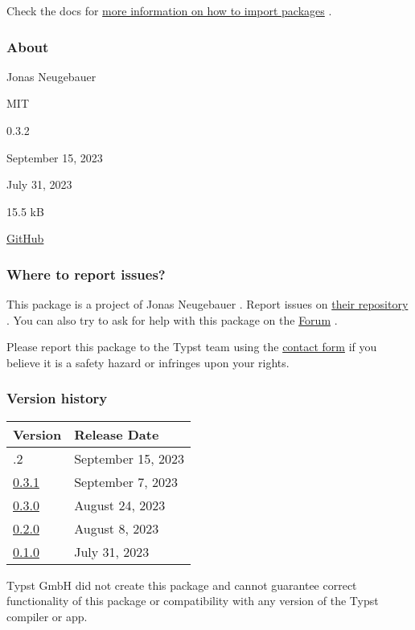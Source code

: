 Check the docs for
\href{https://typst.app/docs/reference/scripting/\#packages}{more
information on how to import packages} .

\subsubsection{About}\label{about}

\begin{description}
\tightlist
\item[Author :]
Jonas Neugebauer
\item[License:]
MIT
\item[Current version:]
0.3.2
\item[Last updated:]
September 15, 2023
\item[First released:]
July 31, 2023
\item[Archive size:]
15.5 kB
\href{https://packages.typst.org/preview/t4t-0.3.2.tar.gz}{\pandocbounded{}}
\item[Repository:]
\href{https://github.com/jneug/typst-tools4typst}{GitHub}
\end{description}

\subsubsection{Where to report issues?}\label{where-to-report-issues}

This package is a project of Jonas Neugebauer . Report issues on
\href{https://github.com/jneug/typst-tools4typst}{their repository} .
You can also try to ask for help with this package on the
\href{https://forum.typst.app}{Forum} .

Please report this package to the Typst team using the
\href{https://typst.app/contact}{contact form} if you believe it is a
safety hazard or infringes upon your rights.

\label{versions}
\subsubsection{Version history}\label{version-history}

\begin{longtable}[]{@{}ll@{}}
\toprule\noalign{}
Version & Release Date \\
\midrule\noalign{}
\endhead
\bottomrule\noalign{}
\endlastfoot
0.3.2 & September 15, 2023 \\
\href{https://typst.app/universe/package/t4t/0.3.1/}{0.3.1} & September
7, 2023 \\
\href{https://typst.app/universe/package/t4t/0.3.0/}{0.3.0} & August 24,
2023 \\
\href{https://typst.app/universe/package/t4t/0.2.0/}{0.2.0} & August 8,
2023 \\
\href{https://typst.app/universe/package/t4t/0.1.0/}{0.1.0} & July 31,
2023 \\
\end{longtable}

Typst GmbH did not create this package and cannot guarantee correct
functionality of this package or compatibility with any version of the
Typst compiler or app.
